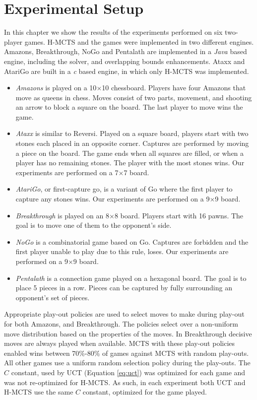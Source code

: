 \documentclass{kecsmstr}
\begin{document}
\section{Experimental Setup}
\label{sec:ex_setup}
In this chapter we show the results of the experiments performed on six two-player games. H-MCTS and the games were implemented in two different engines. Amazons, Breakthrough, NoGo and Pentalath are implemented in a \emph{Java} based engine, including the solver, and overlapping bounds enhancements. Ataxx and AtariGo are built in a \emph{c} based engine, in which only H-MCTS was implemented.
\begin{itemize}
\item \emph{Amazons} is played on a 10$\times$10 chessboard. Players have four Amazons that move as queens in chess. Moves consist of two parts, movement, and shooting an arrow to block a square on the board. The last player to move wins the game.
\item \emph{Ataxx} is similar to Reversi. Played on a square board, players start with two stones each placed in an opposite corner. Captures are performed by moving a piece on the board. The game ends when all squares are filled, or when a player has no remaining stones. The player with the most stones wins. Our experiments are performed on a 7$\times$7 board.
\item \emph{AtariGo}, or first-capture go, is a variant of Go where the first player to capture any stones wins. Our experiments are performed on a 9$\times$9 board.
\item \emph{Breakthrough} is played on an 8$\times$8 board. Players start with 16 pawns. The goal is to move one of them to the opponent's side.
\item \emph{NoGo} is a combinatorial game based on Go. Captures are forbidden and the first player unable to play due to this rule, loses. Our experiments are performed on a 9$\times$9 board.
\item \emph{Pentalath} is a connection game played on a hexagonal board. The goal is to place 5 pieces in a row. Pieces can be captured by fully surrounding an opponent's set of pieces.
\end{itemize}

Appropriate play-out policies are used to select moves to make during play-out for both Amazons, and Breakthrough. The policies select over a non-uniform move distribution based on the properties of the moves. In Breakthrough decisive moves are always played when available. MCTS with these play-out policies enabled wins between 70\%-80\% of games against MCTS with random play-outs. All other games use a uniform random selection policy during the play-outs. The $C$ constant, used by UCT (Equation \ref{eq:uct}) was optimized for each game and was not re-optimized for H-MCTS. As such, in each experiment both UCT and H-MCTS use the same $C$ constant, optimized for the game played.
\end{document}
